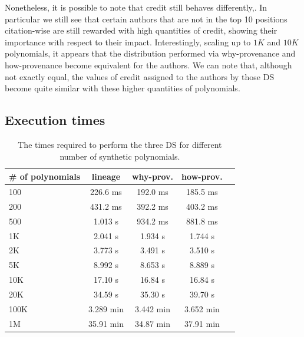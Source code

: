 Nonetheless, it is possible to note that credit still behaves differently,. In particular we still see that certain authors that are not in the top 10 positions citation-wise are still rewarded with high quantities of credit, showing their importance with respect to their impact. 
Interestingly, scaling up to $1K$ and $10K$ polynomials, it appears that the distribution performed via why-provenance and how-provenance become equivalent for the authors. We can note that, although not exactly equal, the values of credit assigned to the authors by those DS become quite similar with these higher quantities of polynomials. 

\subsection{Execution times}

\begin{table}[hbt]
\centering
  \begin{tabular}{| l |c | c | c | c ||}
  \hline
    \# of polynomials  & lineage & why-prov. & how-prov. \\
    \hline
    100 & 226.6 ms & 192.0 ms & 185.5 ms \\
    200 & 431.2 ms & 392.2 ms & 403.2 ms \\
    500 & 1.013 s  & 934.2 ms & 881.8 ms \\ 
    1K  & 2.041 s  & 1.934 s  & 1.744 s  \\
    2K  & 3.773 s  & 3.491 s  & 3.510 s  \\
    5K  & 8.992 s  & 8.653 s  & 8.889 s  \\
    10K & 17.10 s  & 16.84 s  & 16.84 s  \\
    20K & 34.59 s  & 35.30 s  & 39.70 s \\
    100K & 3.289 min & 3.442 min & 3.652 min \\
    1M  & 35.91 min & 34.87 min & 37.91 min \\
    \hline
  \end{tabular}
  \caption{The times required to perform the three DS for different number of synthetic polynomials.}
  \label{table:times}
\end{table}

